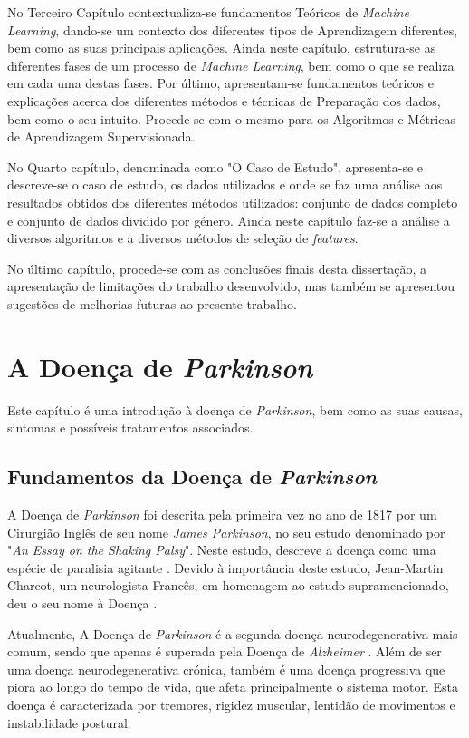\documentclass[12pt,a4paper,twoside]{report}
\begin{document}
{No Terceiro Capítulo contextualiza-se fundamentos Teóricos de \textit{Machine Learning}, dando-se um contexto dos diferentes tipos de Aprendizagem diferentes, bem como as suas principais aplicações. Ainda neste capítulo, estrutura-se as diferentes fases de um processo de \textit{Machine Learning}, bem como o que se realiza em cada uma destas fases. Por último, apresentam-se fundamentos teóricos e explicações acerca dos diferentes métodos e técnicas de Preparação dos dados, bem como o seu intuito. Procede-se com o mesmo para os Algoritmos e Métricas de Aprendizagem Supervisionada.

No Quarto capítulo, denominada como "O Caso de Estudo", apresenta-se e descreve-se o caso de estudo, os dados utilizados e onde se faz uma análise aos resultados obtidos dos diferentes métodos utilizados: conjunto de dados completo e conjunto de dados dividido por género. Ainda neste capítulo faz-se a análise a diversos algoritmos e a diversos métodos de seleção de \textit{features}.

No último capítulo, procede-se com as conclusões finais desta dissertação, a apresentação de limitações do trabalho desenvolvido, mas também se apresentou sugestões de melhorias futuras ao presente trabalho.



\chapter{A Doença de \textit{Parkinson}}

Este capítulo é uma introdução à doença de \textit{Parkinson}, bem como as suas causas, sintomas e possíveis tratamentos associados.

\section{Fundamentos da Doença de \textit{Parkinson}}

A Doença de \textit{Parkinson} foi descrita pela primeira vez no ano de 1817 por um Cirurgião Inglês de seu nome \textit{James Parkinson}, no seu estudo denominado por "\textit{An Essay on the Shaking Palsy}". Neste estudo, descreve a doença como uma espécie de paralisia agitante \cite{Donaldson2015}. Devido à importância deste estudo, Jean-Martin Charcot, um neurologista Francês, em homenagem ao estudo supramencionado, deu o seu nome à Doença \cite{Parent2018}.

Atualmente, A Doença de \textit{Parkinson} é a segunda doença neurodegenerativa mais comum, sendo que apenas é superada pela Doença de \textit{Alzheimer} \cite{Cabreira_Massano_2019}. Além de ser uma doença neurodegenerativa crónica, também é uma doença progressiva que piora ao longo do tempo de vida, que afeta principalmente o sistema motor. Esta doença é caracterizada por tremores, rigidez muscular, lentidão de movimentos e instabilidade postural.  

}
\end{document}
